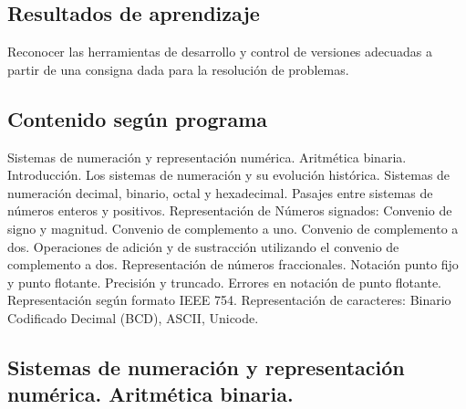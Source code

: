 \subsection*{Resultados de aprendizaje}
Reconocer las herramientas de desarrollo y control de versiones adecuadas a partir de una consigna dada para la resolución de problemas.

\subsection*{Contenido según programa}
Sistemas de numeración y representación numérica.  Aritmética binaria.  Introducción. Los sistemas de numeración y su evolución histórica.  Sistemas de numeración decimal, binario, octal y hexadecimal. Pasajes entre sistemas de números enteros y positivos.  Representación de Números signados: Convenio de signo y magnitud. Convenio de complemento a uno.  Convenio de complemento a dos. Operaciones de adición y de sustracción utilizando el convenio de complemento a dos.  Representación de números fraccionales. Notación punto fijo y punto flotante.  Precisión y truncado.  Errores en notación de punto flotante.  Representación según formato IEEE 754.  Representación de caracteres: Binario Codificado Decimal (BCD), ASCII, Unicode.

\subsection*{Sistemas de numeración y representación numérica. Aritmética binaria.}
\setcounter{subsection}{2}

